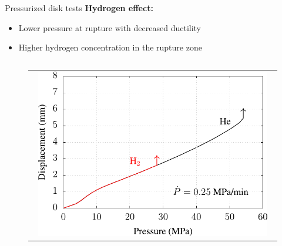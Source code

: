 \documentclass[9pt]{beamer}
\begin{document}

\begin{frame}{Pressurized disk tests}
    \textbf{Hydrogen effect:}

    \vspace{0.2cm}

    \begin{itemize}
        \item Lower pressure at rupture with decreased ductility
        \vspace{0.15cm}
        \item Higher hydrogen concentration in the rupture zone
    \end{itemize}

    \vspace{0.1cm}

    \begin{columns}

        \begin{column}{0.45\textwidth}

            \begin{figure}
                \begin{tabular}{c}
                    \includegraphics[width=0.95\textwidth]{Images/fig_disk_tP.pdf}\\
                \end{tabular}
            \end{figure}

        \end{column}
    

\end{columns}
\end{frame}
\end{document}
